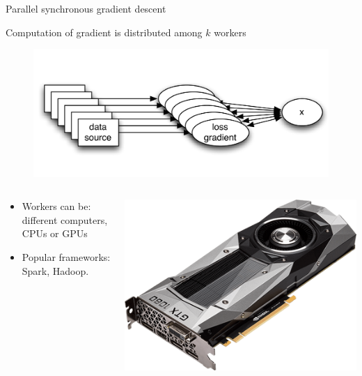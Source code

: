 \documentclass[10pt]{beamer}
\begin{document}
\begin{frame}{Parallel synchronous gradient descent}

Computation of gradient is distributed among $k$ workers

\begin{figure}
{\centering\includegraphics[width=0.5\linewidth]{img/mapreduce}}
\end{figure}

\begin{columns}
\begin{column}{0.7\textwidth}  %
\begin{itemize}
\item Workers can be: different computers, CPUs or GPUs

\item Popular frameworks: Spark, Hadoop.
\end{itemize}
\end{column}
\begin{column}{0.3\textwidth}  %
\includegraphics[width=\linewidth]{img/gpu}
\end{column}
\end{columns}
\end{frame}
\end{document}
